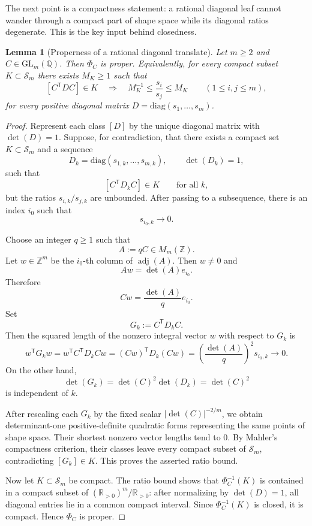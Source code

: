 \documentclass[11pt,letterpaper]{amsart}
\newcommand{\Q}{\mathbb{Q}}
\newcommand{\Z}{\mathbb{Z}}
\newcommand{\R}{\mathbb{R}}
\newcommand{\GL}{\mathrm{GL}}
\newcommand{\diag}{\mathrm{diag}}
\theoremstyle{plain}
\newtheorem{lemma}[theorem]{Lemma}
\theoremstyle{definition}
\begin{document}
The next point is a compactness statement: a rational diagonal leaf cannot wander through a compact part of shape space while its diagonal ratios degenerate. This is the key input behind closedness.


\begin{lemma}[Properness of a rational diagonal translate]
\label{lem:proper-rational-leaf}
Let \(m\ge 2\) and \(C\in \GL_m(\Q)\). Then \(\Phi_C\) is proper.
Equivalently, for every compact subset \(K\subset \mathscr S_m\) there exists
\(M_K\ge 1\) such that
\[
[C^{\mathsf T}DC]\in K
\quad\Longrightarrow\quad
M_K^{-1}\le \frac{s_i}{s_j}\le M_K
\qquad (1\le i,j\le m),
\]
for every positive diagonal matrix \(D=\diag(s_1,\dots,s_m)\).
\end{lemma}

\begin{proof}
Represent each class \([D]\) by the unique diagonal matrix with \(\det(D)=1\).
Suppose, for contradiction, that there exists a compact set
\(K\subset \mathscr S_m\) and a sequence
\[
D_k=\diag(s_{1,k},\dots,s_{m,k}),
\qquad
\det(D_k)=1,
\]
such that
\[
[C^{\mathsf T}D_kC]\in K
\qquad\text{for all }k,
\]
but the ratios \(s_{i,k}/s_{j,k}\) are unbounded.  After passing to a
subsequence, there is an index \(i_0\) such that
\[
s_{i_0,k}\longrightarrow 0.
\]

Choose an integer \(q\ge 1\) such that
\[
A:=qC\in M_m(\Z).
\]
Let \(w\in \Z^m\) be the \(i_0\)-th column of \(\operatorname{adj}(A)\).  Then
\(w\neq 0\) and
\[
Aw=\det(A)e_{i_0}.
\]
Therefore
\[
Cw=\frac{\det(A)}{q}e_{i_0}.
\]
Set
\[
G_k:=C^{\mathsf T}D_kC.
\]
Then the squared length of the nonzero integral vector \(w\) with respect to
\(G_k\) is
\[
w^{\mathsf T}G_kw
=
w^{\mathsf T}C^{\mathsf T}D_kCw
=
(Cw)^{\mathsf T}D_k(Cw)
=
\left(\frac{\det(A)}{q}\right)^2 s_{i_0,k}
\longrightarrow 0.
\]
On the other hand,
\[
\det(G_k)=\det(C)^2\det(D_k)=\det(C)^2
\]
is independent of \(k\).

After rescaling each \(G_k\) by the fixed scalar \(|\det(C)|^{-2/m}\), we
obtain determinant-one positive-definite quadratic forms representing the same
points of shape space.  Their shortest nonzero vector lengths tend to \(0\).
By Mahler's compactness criterion, their classes leave every compact subset of
\(\mathscr S_m\), contradicting \([G_k]\in K\).  This proves the asserted ratio
bound.

Now let \(K\subset \mathscr S_m\) be compact.  The ratio bound shows that
\(\Phi_C^{-1}(K)\) is contained in a compact subset of
\((\R_{>0})^m/\R_{>0}\): after normalizing by \(\det(D)=1\), all diagonal
entries lie in a common compact interval.  Since \(\Phi_C^{-1}(K)\) is closed,
it is compact.  Hence \(\Phi_C\) is proper.
\end{proof}
\end{document}
